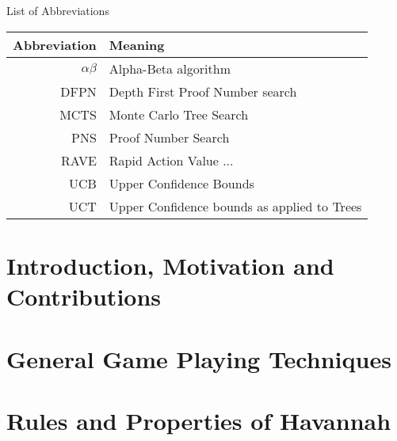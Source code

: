 \documentclass[12pt, letterpaper]{report}
\numberwithin{equation}{section}
\begin{document}
	\section*{}
	\begin{flushright}
		\huge{List of Abbreviations}
	\end{flushright}
	\vspace{0.4in}
	\begin{center}
		\begin{tabular}{rl}
			Abbreviation & Meaning \\
			\hline
			$\alpha\beta$ & Alpha-Beta algorithm \\
			DFPN		& Depth First Proof Number search \\
			MCTS		& Monte Carlo Tree Search \\
			PNS			& Proof Number Search \\
			RAVE		& Rapid Action Value ... \\
			UCB			& Upper Confidence Bounds \\
			UCT			& Upper Confidence bounds as applied to Trees \\

		\end{tabular}
	\end{center}	
	
	
	

	\newpage
	\setcounter{page}{1}

	\chapter[Introduction]{\label{intro} \LARGE Introduction, Motivation and Contributions}
	

	\chapter[Background]{\label{intro} \LARGE General Game Playing Techniques}
	

	\chapter[Havannah]{\label{havannah} \LARGE Rules and Properties of Havannah}
	
	
\end{document}
